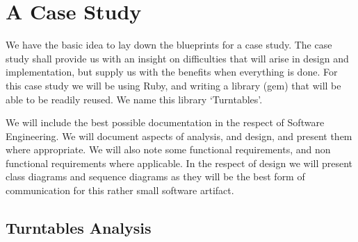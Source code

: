 \section{A Case Study}

We have the basic idea to lay down the blueprints for a case study. The case
study shall provide us with an insight on difficulties that will arise in
design and implementation, but supply us with the benefits when everything is
done. For this case study we will be using Ruby, and writing a library (gem)
that will be able to be readily reused. We name this library `Turntables'.

We will include the best possible documentation in the respect of Software
Engineering. We will document aspects of analysis, and design, and present them
where appropriate. We will also note some functional requirements, and non
functional requirements where applicable. In the respect of design we will
present class diagrams and sequence diagrams as they will be the best form of
communication for this rather small software artifact.

\subsection{Turntables Analysis} 





